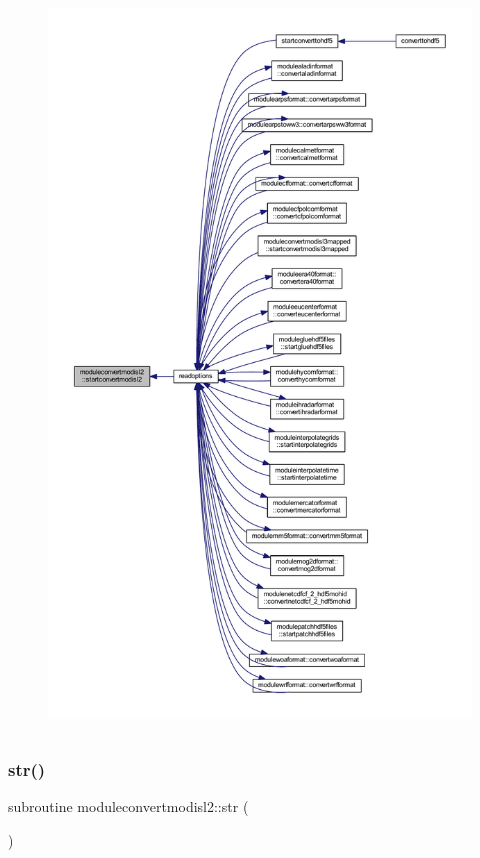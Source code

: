 \begin{figure}[H]
\begin{center}
\leavevmode
\includegraphics[height=550pt]{namespacemoduleconvertmodisl2_aa38d6c70d36fe4b61950bdeaf7f6ff18_icgraph}
\end{center}
\end{figure}
\mbox{\label{namespacemoduleconvertmodisl2_a1526471e2bde49d7ab2752ae78288ef5}} 
\subsubsection{\texorpdfstring{str()}{str()}}
{\footnotesize\ttfamily subroutine moduleconvertmodisl2\+::str (\begin{DoxyParamCaption}{ }\end{DoxyParamCaption})\hspace{0.3cm}{\ttfamily [private]}}



